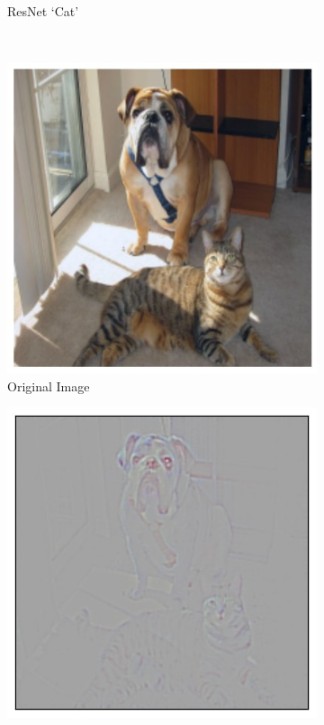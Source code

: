 \begin{figure}[t!]
\begin{subfigure}[t]{0.161\textwidth}
		\caption{\scriptsize{ResNet \gcam{} `Cat'}}
        \label{fig:teaser_cat_occlusion}
	\end{subfigure}\\
    \vspace*{10pt}
	\begin{subfigure}[t]{0.161\textwidth}
		\centering
        \includegraphics[width=\textwidth]{figures/teaser/original.jpg}
        \caption{\scriptsize{Original Image}\hspace{-12pt}}
	\end{subfigure}
	\begin{subfigure}[t]{0.161\textwidth}
		\centering
        \includegraphics[width=\textwidth]{figures/teaser/dog_gb.jpg}

\end{subfigure}
\end{figure}
